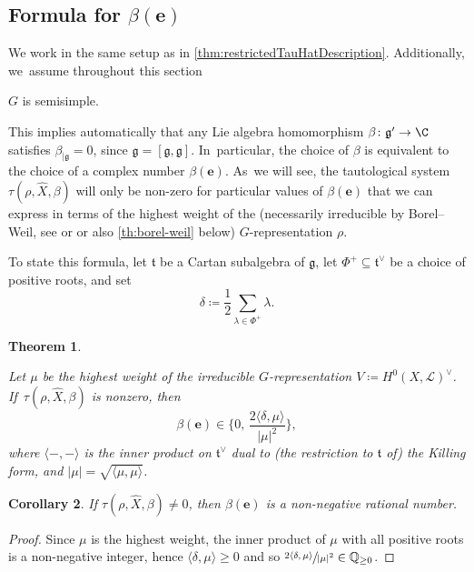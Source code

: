 \documentclass[JEP,XML,SOM,Unicode,published]{cedram}
\let\mathds\mathbb
\newcommand{\bme}{{\boldsymbol{e}}}
\newtheorem{thm}{Theorem}[section]
\newtheorem{cor}[thm]{Corollary}
\newcommand{\dQ}{{\mathds Q}}\let\Q\dQ
\newcommand{\frg}{\mathfrak{g}}
\newcommand\restr[2]{{#1_{| {#2}}}}
\begin{document}
\subsection{Formula for \texorpdfstring{$\beta(\bme)$}{beta(e)}}
We work in the same setup as in \cref{thm:restrictedTauHatDescription}. Additionally, we~assume throughout this section

\begin{center}
$G$ is semisimple.
\end{center}
This implies automatically that any Lie algebra homomorphism $\beta \colon \frg' \to \C$ satisfies $\restr{\beta}{\frg} = 0$, since $\frg = [\frg, \frg]$. In~particular, the choice of $\beta$ is equivalent to the choice of a complex number $\beta(\bme)$. As~we will see, the tautological system $\tau(\rho, \hat{X},\beta)$ will only be non-zero for particular values of $\beta(\bme)$ that we can express in terms of the highest weight of the (necessarily irreducible by Borel--Weil, see \eg \cite{Ser54} or \cite[Cor.\,to\,Th.\,V]{Bot57} or also \cref{th:borel-weil} below) $G$-representation $\rho$.

To state this formula, let $\mathfrak{t}$ be a Cartan subalgebra of $\mathfrak{g}$, let $\Phi^+\subseteq \mathfrak{t}^\vee$ be a choice of positive roots, and set
\[
\delta\coloneqq \frac{1}{2}\sum_{\lambda\in \Phi^+} \lambda.
\]

\begin{thm}\label{th:reptheory-beta}

Let $\mu$ be the highest weight of the irreducible $G$-representation $V\coloneqq H^0(X, \mathscr{L})^\vee$. If~$\tau(\rho,\hat{X},\beta)$ is nonzero, then
\[
\beta(\bme) \in \Big\{0, \, \frac{2\langle \delta, \mu\rangle}{|\mu|^2}\Big\},
\]
where $\langle-,-\rangle$ is the inner product on $\mathfrak{t}^\vee$ dual to (the restriction to $\mathfrak{t}$ of) the Killing form, and $|\mu|=\sqrt{\langle\mu,\mu\rangle}$.
\end{thm}

\begin{cor}\label{cor:BetaNonNeg}
If $\tau(\rho, \hat X, \beta) \neq 0$, then $\beta(\bme)$ is a non-negative rational number.
\end{cor}

\begin{proof}
Since $\mu$ is the highest weight, the inner product of $\mu$ with all positive roots is a non-negative integer, hence $\langle \delta, \mu \rangle \geq 0$ and so $\sfrac{2\langle \delta, \mu\rangle}{|\mu|^2}\in\dQ_{\geq 0}$.
\end{proof}
\end{document}
